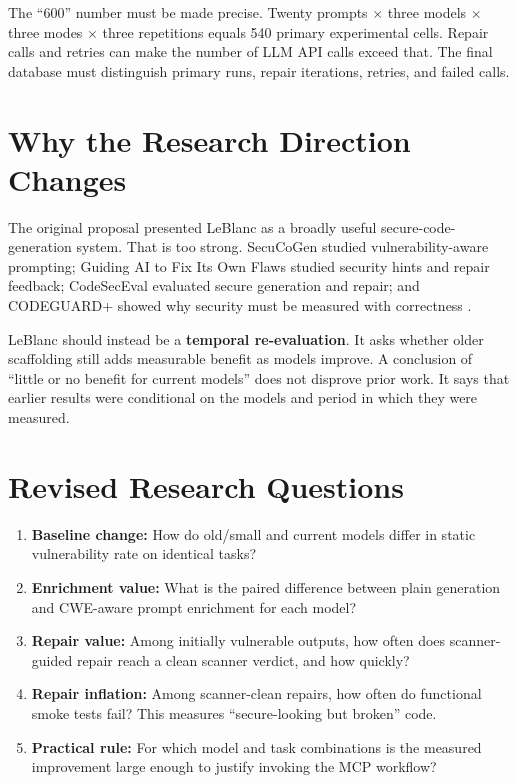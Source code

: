 \documentclass[11pt,a4paper]{article}
\begin{document}
The ``600'' number must be made precise. Twenty prompts $\times$ three models $\times$ three modes $\times$ three repetitions equals 540 primary experimental cells. Repair calls and retries can make the number of LLM API calls exceed that. The final database must distinguish primary runs, repair iterations, retries, and failed calls.

\section{Why the Research Direction Changes}
The original proposal presented LeBlanc as a broadly useful secure-code-generation system. That is too strong. SecuCoGen studied vulnerability-aware prompting; Guiding AI to Fix Its Own Flaws studied security hints and repair feedback; CodeSecEval evaluated secure generation and repair; and CODEGUARD+ showed why security must be measured with correctness \cite{secucogen,guiding,codesec,codeguard}.

LeBlanc should instead be a \textbf{temporal re-evaluation}. It asks whether older scaffolding still adds measurable benefit as models improve. A conclusion of ``little or no benefit for current models'' does not disprove prior work. It says that earlier results were conditional on the models and period in which they were measured.

\section{Revised Research Questions}
\begin{enumerate}
\item \textbf{Baseline change:} How do old/small and current models differ in static vulnerability rate on identical tasks?
\item \textbf{Enrichment value:} What is the paired difference between plain generation and CWE-aware prompt enrichment for each model?
\item \textbf{Repair value:} Among initially vulnerable outputs, how often does scanner-guided repair reach a clean scanner verdict, and how quickly?
\item \textbf{Repair inflation:} Among scanner-clean repairs, how often do functional smoke tests fail? This measures ``secure-looking but broken'' code.
\item \textbf{Practical rule:} For which model and task combinations is the measured improvement large enough to justify invoking the MCP workflow?
\end{enumerate}
\end{document}
